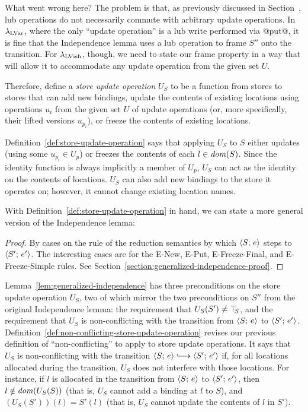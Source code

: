 What went wrong here?  The problem is that, as previously discussed in
Section~\either{\ref{subsection:lvars-generalizing-from-least-upper-bound-writes}}{\ref{s:lvars-generalizing}},
lub operations do not necessarily commute with arbitrary update
operations.  In $\lambda_{\textrm{LVar}}$, where the only ``update operation'' is
a lub write performed via @put@, it is fine that the Independence
lemma uses a lub operation to frame $S''$ onto the transition. For
$\lambda_{\textrm{LVish}}$, though, we need to state our frame property in a way
that will allow it to accommodate any update operation from the given
set $U$.

Therefore,  define a \emph{store update operation} $U_S$ to be a
function from stores to stores that can add new bindings, update the
contents of existing locations using operations $u_i$ from the given
set $U$ of update operations (or, more specifically, their lifted
versions $u_{p_i}$), or freeze the contents of existing locations.

\DefStoreUpdateOperation

\noindent Definition~\ref{def:store-update-operation} says that applying $U_S$
to $S$ either updates (using some $u_{p_i} \in U_p$) or freezes the
contents of each $l \in \mathit{dom}(S)$.  Since the identity function is
always implicitly a member of $U_p$, $U_S$ can act as the identity on
the contents of locations.  $U_S$ can also add new bindings to the
store it operates on; however, it cannot change existing location
names.

With Definition~\ref{def:store-update-operation} in hand, we can state
a more general version of the Independence lemma:

\LemGeneralizedIndependence
\ifdefined\DISSERTATION
\begin{proof}
  By cases on the rule of the reduction semantics by which
  $\langle S;\, e \rangle$ steps to $\langle S';\, e' \rangle$.  The interesting cases
  are for the {\sc E-New}, {\sc E-Put}, {\sc E-Freeze-Final}, and {\sc
    E-Freeze-Simple} rules.  See
  Section~\ref{section:generalized-independence-proof}.
\end{proof}
\fi

Lemma~\ref{lem:generalized-independence} has three preconditions on
the store update operation $U_S$, two of which mirror the two
preconditions on $S''$ from the original Independence lemma: the
requirement that $U_S(S') \neq \top\hspace{-0.85mm}_{S}$, and the requirement that $U_S$
is non-conflicting with the transition from $\langle S;\, e \rangle$ to
$\langle S';\, e' \rangle$.
Definition~\ref{def:non-conflicting-store-update-operation} revises
our previous definition of ``non-conflicting'' to apply to store update
operations.  It says that $U_S$ is non-conflicting with the transition
$\config{S}{e} \parstepsto \config{S'}{e'}$ if, for all locations
allocated during the transition, $U_S$ does not interfere with those
locations.  For instance, if $l$ is allocated in the transition from
$\langle S;\, e \rangle$ to $\langle S';\, e' \rangle$, then $l \notin \mathit{dom}(U_S(S))$
(that is, $U_S$ cannot add a binding at $l$ to $S$), and $(U_S(S'))(l)
= S'(l)$ (that is, $U_S$ cannot update the contents of $l$ in $S'$).

